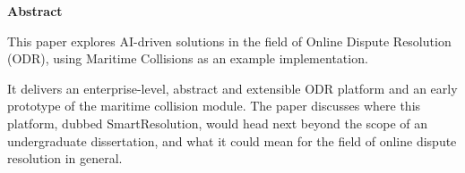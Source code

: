 \thispagestyle{empty}

\begin{center}
    {\LARGE\bf Abstract}
\end{center}

This paper explores AI-driven solutions in the field of Online Dispute Resolution (ODR), using Maritime Collisions as an example implementation.

It delivers an enterprise-level, abstract and extensible ODR platform and an early prototype of the maritime collision module. The paper discusses where this platform, dubbed SmartResolution, would head next beyond the scope of an undergraduate dissertation, and what it could mean for the field of online dispute resolution in general.